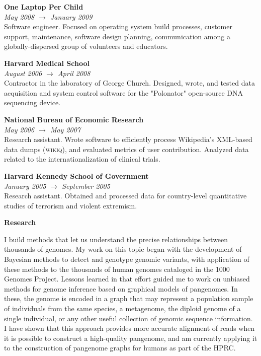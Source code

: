 \documentclass[11pt,hidelinks,letterpaper]{article}
\begin{document}
\hfill \break
\noindent
{\large \bf One Laptop Per Child} \\
\emph{May 2008 $\to$ January 2009} \\
Software engineer. Focused on operating system build processes, customer support, maintenance, software design planning, communication among a globally-dispersed group of volunteers and educators.

\hfill \break
\noindent
{\large \bf Harvard Medical School} \\
\emph{August 2006 $\to$ April 2008} \\
Contractor in the laboratory of George Church. Designed, wrote, and tested data acquisition and system control software for the "Polonator" open-source DNA sequencing device.

\hfill \break
\noindent
{\large \bf National Bureau of Economic Research} \\
\emph{May 2006 $\to$ May 2007} \\
Research assistant. Wrote software to efficiently process Wikipedia's XML-based data dumps (\textsc{wikiq}), and evaluated metrics of user contribution. Analyzed data related to the internationalization of clinical trials.

\hfill \break
\noindent
{\large \bf Harvard Kennedy School of Government} \\
\emph{January 2005 $\to$ September 2005} \\
Research assistant. Obtained and processed data for country-level quantitative studies of terrorism and violent extremism.

\hfill \break
\hfill \break
\noindent
{\LARGE \bf Research}

\hfill \break
\noindent
I build methods that let us understand the precise relationships between thousands of genomes.
My work on this topic began with the development of Bayesian methods to detect and genotype genomic variants, with application of these methods to the thousands of human genomes cataloged in the 1000 Genomes Project.
Lessons learned in that effort guided me to work on unbiased methods for genome inference based on graphical models of pangenomes.
In these, the genome is encoded in a graph that may represent a population sample of individuals from the same species, a metagenome, the diploid genome of a single individual, or any other useful collection of genomic sequence information.
I have shown that this approach provides more accurate alignment of reads when it is possible to construct a high-quality pangenome, and am currently applying it to the construction of pangenome graphs for humans as part of the HPRC.
\end{document}
